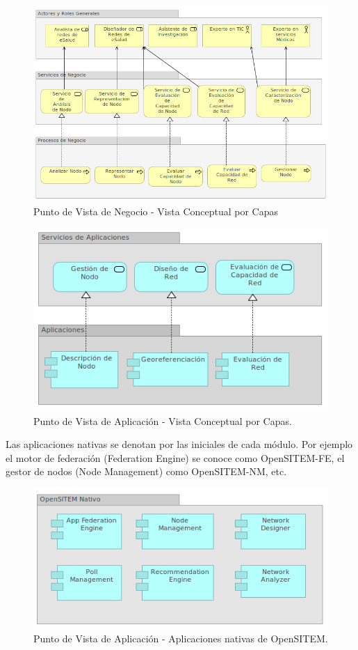 \begin{figure}
 \centering
 \includegraphics[width=120mm]{negocio_vista_por_capas.png}
 \caption{Punto de Vista de Negocio - Vista Conceptual por Capas}
 \label{punto_negocio}
\end{figure}

\begin{figure}
 \centering
 \includegraphics[width=120mm]{punto_aplicacion.png}
 \caption{Punto de Vista de Aplicación - Vista Conceptual por Capas.}
 \label{punto_aplicacion}
\end{figure}

Las aplicaciones nativas se denotan por las iniciales de cada módulo. Por ejemplo el motor de federación (Federation Engine) se conoce como OpenSITEM-FE, el gestor de nodos (Node Management) como OpenSITEM-NM, etc.

\begin{figure}
 \centering
 \includegraphics[width=120mm]{opensitem_nativo.png}
 \caption{Punto de Vista de Aplicación - Aplicaciones nativas de OpenSITEM.}
 \label{punto_aplicacion}
\end{figure}


